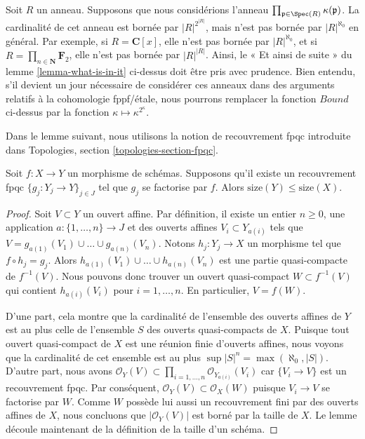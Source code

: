 \begin{remark}
\label{remark-what-is-not-in-it}
Soit $R$ un anneau. Supposons que nous considérions l'anneau
$\prod_{\mathfrak p \in \Spec(R)} \kappa(\mathfrak p)$.
La cardinalité de cet anneau est bornée par $|R|^{2^{|R|}}$, mais n'est pas
bornée par $|R|^{\aleph_0}$ en général.
Par exemple, si $R = \mathbf{C}[x]$, elle n'est pas bornée par
$|R|^{\aleph_0}$, et si $R = \prod_{n \in \mathbf{N}} \mathbf{F}_2$,
elle n'est pas bornée par $|R|^{|R|}$.
Ainsi, le « Et ainsi de suite » du lemme \ref{lemma-what-is-in-it} ci-dessus
doit être pris avec prudence. Bien entendu, s'il devient un jour nécessaire
de considérer ces anneaux dans des arguments relatifs à la cohomologie
fppf/\'etale, nous pourrons remplacer la fonction $Bound$ ci-dessus par la
fonction $\kappa \mapsto \kappa^{2^\kappa}$.
\end{remark}

\noindent
Dans le lemme suivant, nous utilisons la notion de recouvrement fpqc introduite
dans Topologies, section \ref{topologies-section-fpqc}.

\begin{lemma}
\label{lemma-bound-by-covering}
Soit $f : X \to Y$ un morphisme de schémas. Supposons qu'il existe un
recouvrement fpqc $\{g_j : Y_j \to Y\}_{j \in J}$ tel que $g_j$ se factorise
par $f$. Alors $\text{size}(Y) \leq \text{size}(X)$.
\end{lemma}

\begin{proof}
Soit $V \subset Y$ un ouvert affine. Par définition, il existe un entier
$n \geq 0$, une application $a : \{1, \ldots, n\} \to J$ et des ouverts
affines $V_i \subset Y_{a(i)}$ tels que
$V = g_{a(1)}(V_1) \cup \ldots \cup g_{a(n)}(V_n)$.
Notons $h_j : Y_j \to X$ un morphisme tel que $f \circ h_j = g_j$.
Alors $h_{a(1)}(V_1) \cup \ldots \cup h_{a(n)}(V_n)$ est une partie
quasi-compacte de $f^{-1}(V)$. Nous pouvons donc trouver un ouvert
quasi-compact $W \subset f^{-1}(V)$ qui contient $h_{a(i)}(V_i)$ pour
$i = 1, \ldots, n$. En particulier, $V = f(W)$.

\medskip\noindent
D'une part, cela montre que la cardinalité de l'ensemble des ouverts affines
de $Y$ est au plus celle de l'ensemble $S$ des ouverts quasi-compacts de $X$.
Puisque tout ouvert quasi-compact de $X$ est une réunion finie d'ouverts
affines, nous voyons que la cardinalité de cet ensemble est au plus
$\sup |S|^n = \max(\aleph_0, |S|)$.
D'autre part, nous avons
$\mathcal{O}_Y(V) \subset \prod_{i = 1, \ldots, n} \mathcal{O}_{Y_{a(i)}}(V_i)$
car $\{V_i \to V\}$ est un recouvrement fpqc. Par conséquent,
$\mathcal{O}_Y(V) \subset \mathcal{O}_X(W)$ puisque $V_i \to V$ se factorise
par $W$. Comme $W$ possède lui aussi un recouvrement fini par des ouverts
affines de $X$, nous concluons que $|\mathcal{O}_Y(V)|$ est borné par la
taille de $X$. Le lemme découle maintenant de la définition de la taille d'un
schéma.
\end{proof}

